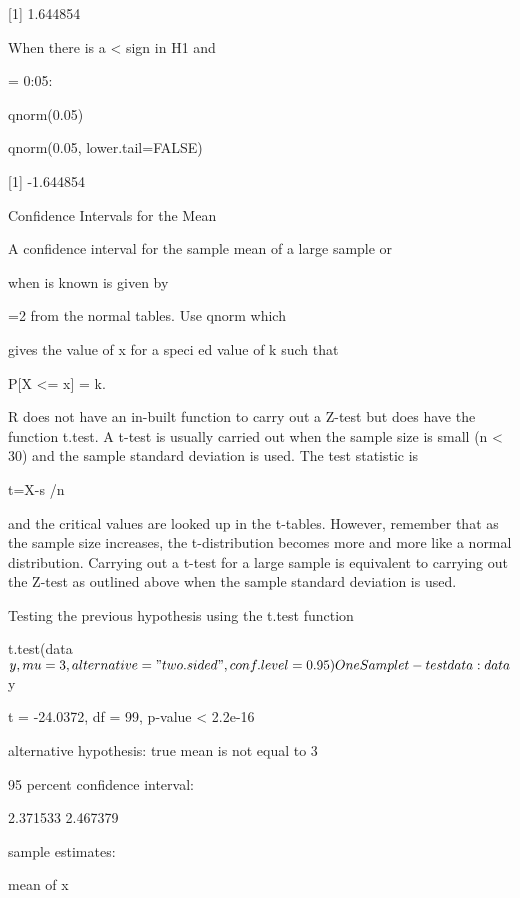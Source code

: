 \begin{frame}
{    [1] 1.644854

When there is a < sign in H1 and

= 0:05:

    qnorm(0.05)

    qnorm(0.05, lower.tail=FALSE)

    [1] -1.644854

 

Confidence Intervals for the Mean

A confidence interval for the sample mean of a large sample or

when  is known is given by


 

=2 from the normal tables. Use qnorm which

gives the value of x for a speci ed value of k such that

P[X <= x] = k.

 

 


R does not have an in-built function to carry out a Z-test but does have the function t.test. A t-test is usually carried out when the sample size is small (n < 30) and the sample standard deviation is used. The test statistic is

 

 

t=X-s /n

 



and the critical values are looked up in the t-tables. However, remember that as the sample size increases, the t-distribution becomes more and more like a normal distribution. Carrying out a t-test for a large sample is equivalent to carrying out the Z-test as outlined above when the sample standard deviation is used.


Testing the previous hypothesis using the t.test function

t.test(data$y, mu=3, alternative="two.sided", conf.level=0.95)

One Sample t-test

data: data$y

t = -24.0372, df = 99, p-value < 2.2e-16

alternative hypothesis: true mean is not equal to 3

95 percent confidence interval:

2.371533 2.467379

sample estimates:

mean of x

}
\end{frame}
